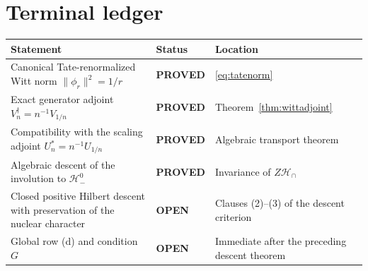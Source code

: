 \documentclass[11pt]{article}
\newcommand{\PROVED}{\textcolor{green!40!black}{\textbf{PROVED}}}
\newcommand{\OPEN}{\textcolor{red!70!black}{\textbf{OPEN}}}
\begin{document}
\section{Terminal ledger}

\begin{center}
\begin{tabular}{>{\raggedright\arraybackslash}p{.48\linewidth}
                >{\raggedright\arraybackslash}p{.18\linewidth}
                >{\raggedright\arraybackslash}p{.24\linewidth}}
\toprule
Statement & Status & Location \\
\midrule
Canonical Tate-renormalized Witt norm $\|\phi_r\|^2=1/r$ & \PROVED &
\eqref{eq:tatenorm}\\
Exact generator adjoint $V_n^\dagger=n^{-1}V_{1/n}$ & \PROVED &
Theorem~\ref{thm:wittadjoint}\\
Compatibility with the scaling adjoint $U_n^*=n^{-1}U_{1/n}$ & \PROVED &
Algebraic transport theorem\\
Algebraic descent of the involution to $\mathcal H_-^0$ & \PROVED &
Invariance of $Z\mathcal H_\cap$\\
Closed positive Hilbert descent with preservation of the nuclear character &
\OPEN & Clauses (2)--(3) of the descent criterion\\
Global row (d) and condition $G$ & \OPEN & Immediate after the preceding
descent theorem\\
\bottomrule
\end{tabular}
\end{center}
\end{document}
